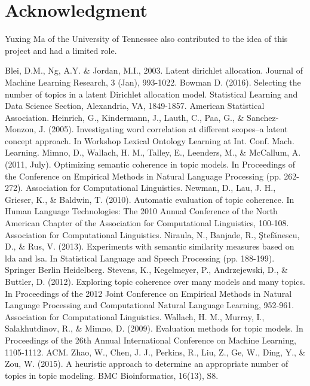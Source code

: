 \documentclass[conference]{IEEEtran}
\begin{document}
\section*{Acknowledgment}

Yuxing Ma of the University of Tennessee also contributed to the idea of this project and had a limited role.

\begin{thebibliography}{00}
 Blei, D.M., Ng, A.Y. \& Jordan, M.I., 2003. Latent dirichlet allocation. Journal of Machine Learning Research, 3 (Jan), 993-1022.
 Bowman D. (2016). Selecting the number of topics in a latent Dirichlet allocation model. Statistical Learning and Data Science Section, Alexandria, VA, 1849-1857. American Statistical Association.
 Heinrich, G., Kindermann, J., Lauth, C., Paa, G., \& Sanchez-Monzon, J. (2005). Investigating word correlation at different scopes--a latent concept approach. In Workshop Lexical Ontology Learning  at Int. Conf. Mach. Learning.
 Mimno, D., Wallach, H. M., Talley, E., Leenders, M., \& McCallum, A. (2011, July). Optimizing semantic coherence in topic models. In Proceedings of the Conference on Empirical Methods in Natural Language Processing (pp. 262-272). Association for Computational Linguistics.
 Newman, D., Lau, J. H., Grieser, K., \& Baldwin, T. (2010). Automatic evaluation of topic coherence. In Human Language Technologies: The 2010 Annual Conference of the North American Chapter of the Association for Computational Linguistics, 100-108. Association for Computational Linguistics.
 Niraula, N., Banjade, R., Ştefănescu, D., \& Rus, V. (2013). Experiments with semantic similarity measures based on lda and lsa. In Statistical Language and Speech Processing (pp. 188-199). Springer Berlin Heidelberg.
 Stevens, K., Kegelmeyer, P., Andrzejewski, D., \& Buttler, D. (2012). Exploring topic coherence over many models and many topics. In Proceedings of the 2012 Joint Conference on Empirical Methods in Natural Language Processing and Computational Natural Language Learning, 952-961. Association for Computational Linguistics.
 Wallach, H. M., Murray, I., Salakhutdinov, R., \& Mimno, D. (2009). Evaluation methods for topic models. In Proceedings of the 26th Annual International Conference on Machine Learning, 1105-1112. ACM.
 Zhao, W., Chen, J. J., Perkins, R., Liu, Z., Ge, W., Ding, Y., \& Zou, W. (2015). A heuristic approach to determine an appropriate number of topics in topic modeling. BMC Bioinformatics, 16(13), S8.
\end{thebibliography}
\vspace{12pt}
\end{document}
